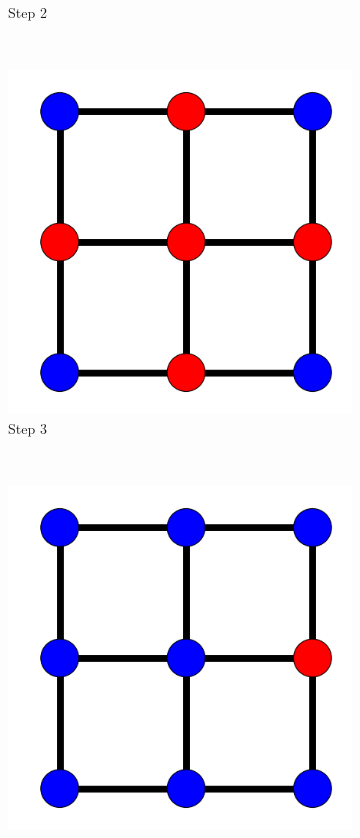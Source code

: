 \documentclass[bsc,frontabs,twoside,singlespacing,parskip,deptreport]{infthesis}     %
\begin{document}
\begin{figure}
\begin{subfigure}[b]{0.23\textwidth}
        \caption{Step 2}
        \label{fig:simpleProcess2}
    \end{subfigure}
    ~ %
    

    \begin{subfigure}[b]{0.23\textwidth}
        \includegraphics[width=\textwidth]{simpleProcess3}
        \caption{Step 3}
        \label{fig:simpleProcess3}
    \end{subfigure}
    ~ %
    \begin{subfigure}[b]{0.23\textwidth}
        \includegraphics[width=\textwidth]{simpleProcess4}

\end{subfigure}
\end{figure}
\end{document}
